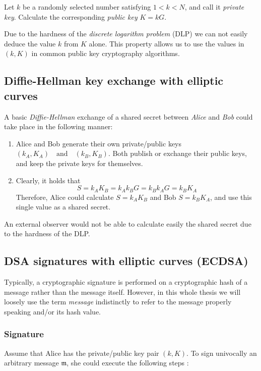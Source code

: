 Let \(k\) be a randomly selected number satisfying \(1 < k < N\), and call it {\em private key}. 
Calculate the corresponding {\em public key} \(K = k G\). 

Due to the hardness of the {\em discrete logarithm problem} (DLP) we can not easily deduce the value \(k\) from \(K\) alone.
This property allows us to use the values in \( (k, K) \) in common public key cryptography algorithms.


\subsection{Diffie-Hellman key exchange with elliptic curves}
A basic {\em Diffie-Hellman} exchange of a shared secret between {\em Alice} and {\em Bob}  could take place in the following manner:

\begin{enumerate}
	
	\item Alice and Bob generate their own private/public keys \((k_A, K_A) \quad \textrm{and} \quad (k_B, K_B)\). Both publish or exchange their public keys, and keep the private keys for themselves.
	
	\item Clearly, it holds that \[S = k_A K_B = k_A k_B G = k_B k_A G = k_B K_A\]
	 Therefore, Alice could calculate \(S = k_A K_B\) and Bob \(S = k_B K_A\),  and use this single value as a shared secret.
	
\end{enumerate}   

An external observer would not be able to calculate easily the shared secret due to the hardness of the DLP.


\subsection{DSA signatures with elliptic curves (ECDSA)}

Typically, a cryptographic signature is performed on a cryptographic hash of a message rather than the message itself.
However, in this whole thesis we will loosely use the term {\em message} indistinctly to refer to the message properly speaking and/or its hash value.

\subsubsection*{Signature}

Assume that Alice has the private/public key pair \((k, K)\). To sign univocally an arbitrary message \(\mathfrak{m}\), she could execute the following steps \cite{Hankerson:2003:GEC:940321}:


